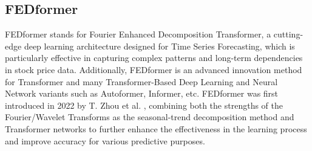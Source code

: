 \documentclass[conference]{IEEEtran}
\begin{document}
\subsection{FEDformer}
FEDformer stands for Fourier Enhanced Decomposition Transformer, a cutting-edge deep learning architecture designed for Time Series Forecasting, which is particularly effective in capturing complex patterns and long-term dependencies in stock price data. Additionally, FEDformer is an advanced innovation method for Transformer and many Transformer-Based Deep Learning and Neural Network variants such as Autoformer, Informer, etc. FEDformer was first introduced in 2022 by T. Zhou et al. \cite{b20}, combining both the strengths of the Fourier/Wavelet Transforms as the seasonal-trend decomposition method and Transformer networks to further enhance the effectiveness in the learning process and improve accuracy for various predictive purposes.
\end{document}
